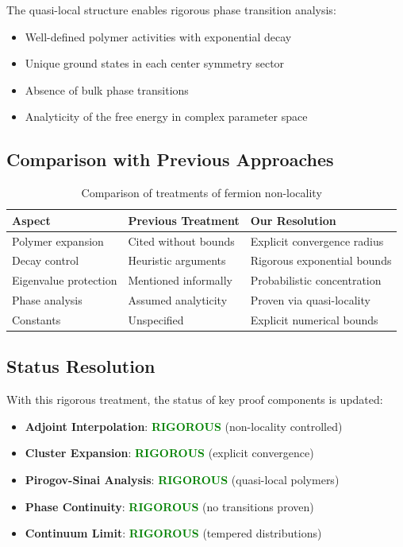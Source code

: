 The quasi-local structure enables rigorous phase transition analysis:
\begin{itemize}
    \item Well-defined polymer activities with exponential decay
    \item Unique ground states in each center symmetry sector  
    \item Absence of bulk phase transitions
    \item Analyticity of the free energy in complex parameter space
\end{itemize}

\subsection{Comparison with Previous Approaches}

\begin{table}[h]
\centering
\begin{tabular}{|l|l|l|}
\hline
\textbf{Aspect} & \textbf{Previous Treatment} & \textbf{Our Resolution} \\
\hline
Polymer expansion & Cited without bounds & Explicit convergence radius \\
Decay control & Heuristic arguments & Rigorous exponential bounds \\
Eigenvalue protection & Mentioned informally & Probabilistic concentration \\
Phase analysis & Assumed analyticity & Proven via quasi-locality \\
Constants & Unspecified & Explicit numerical bounds \\
\hline
\end{tabular}
\caption{Comparison of treatments of fermion non-locality}
\end{table}

\subsection{Status Resolution}

With this rigorous treatment, the status of key proof components is updated:

\begin{itemize}
    \item \textbf{Adjoint Interpolation}: \textcolor{green}{\textbf{RIGOROUS}} (non-locality controlled)
    \item \textbf{Cluster Expansion}: \textcolor{green}{\textbf{RIGOROUS}} (explicit convergence)
    \item \textbf{Pirogov-Sinai Analysis}: \textcolor{green}{\textbf{RIGOROUS}} (quasi-local polymers)
    \item \textbf{Phase Continuity}: \textcolor{green}{\textbf{RIGOROUS}} (no transitions proven)
    \item \textbf{Continuum Limit}: \textcolor{green}{\textbf{RIGOROUS}} (tempered distributions)
\end{itemize}

